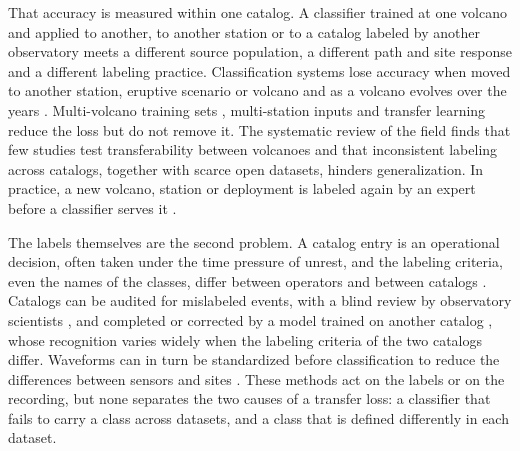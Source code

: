 \documentclass[pdflatex,sn-mathphys-num]{sn-jnl}
\begin{document}
That accuracy is measured within one catalog. A classifier trained at one
volcano and applied to another, to another station or to a catalog labeled
by another observatory meets a different source population, a different
path and site response and a different labeling practice. Classification
systems lose accuracy when moved to another station, eruptive scenario or
volcano \cite{cortes_practical_2021} and as a volcano evolves over the
years \cite{castro-cabrera_adaptive_2021}. Multi-volcano training sets
\cite{fee_generalized_2025}, multi-station inputs
\cite{salazar_multi-station_2023} and transfer learning
\cite{bueno_volcano-seismic_2020} reduce the loss but do not remove it. The
systematic review of the field \cite{morales_artificial_2026} finds that few
studies test transferability between volcanoes and that inconsistent
labeling across catalogs, together with scarce open datasets, hinders
generalization. In practice, a new volcano, station or deployment is
labeled again by an expert before a classifier serves it
\cite{cortes_practical_2021}.

The labels themselves are the second problem. A catalog entry is an
operational decision, often taken under the time pressure of unrest, and
the labeling criteria, even the names of the classes, differ between
operators and between catalogs
\cite{cortes_practical_2021,titos_could_2025}. Catalogs can be audited for
mislabeled events, with a blind review by observatory scientists
\cite{anzieta_cleaning_2023}, and completed or corrected by a model trained
on another catalog \cite{titos_could_2025}, whose recognition varies widely
when the labeling criteria of the two catalogs differ. Waveforms can in turn
be standardized before classification to reduce the differences between
sensors and sites \cite{cortes_standardization_2019}. These methods act on
the labels or on the recording, but none separates the two causes of a
transfer loss: a classifier that fails to carry a class across datasets,
and a class that is defined differently in each dataset.
\end{document}
